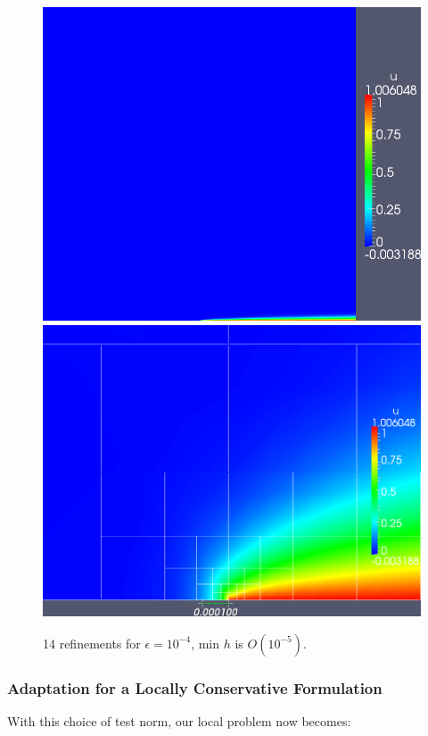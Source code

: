 \documentclass[letterpaper]{article}
\begin{document}
\begin{figure}[!h]
\centering
\includegraphics[scale=.25]{figs/LaplaceFigs/coupled1e4h1e5.png}
\includegraphics[scale=.227]{figs/LaplaceFigs/coupled1e4h1e5Zoom.png}
\caption{14 refinements for $\epsilon = 10^{-4}$, min $h$ is $O(10^{-5})$.}
\label{fig:newNormSmallEps}
\end{figure}

\subsubsection{Adaptation for a Locally Conservative Formulation}
With this choice of test norm, our local problem now becomes:
\end{document}
